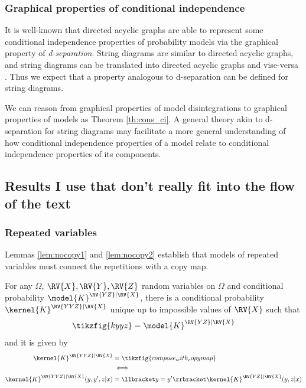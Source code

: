 \subsubsection{Graphical properties of conditional independence}

It is well-known that directed acyclic graphs are able to represent some conditional independence properties of probability models via the graphical property of \emph{d-separation}. String diagrams are similar to directed acyclic graphs, and string diagrams can be translated into directed acyclic graphs and vise-versa \citep{fong_causal_2013}. Thus we expect that a property analogous to d-separation can be defined for string diagrams.

We can reason from graphical properties of model disintegrations to graphical properties of models as Theorem \ref{th:cons_ci}. A general theory akin to d-separation for string diagrams may facilitate a more general understanding of how conditional independence properties of a model relate to conditional independence properties of its components.


\subsection{Results I use that don't really fit into the flow of the text}

\subsubsection{Repeated variables}

Lemmas \ref{lem:nocopy1} and \ref{lem:nocopy2} establish that models of repeated variables must connect the repetitions with a copy map.

\begin{lemma}\label{lem:nocopy1}
For any $\Omega$, $\RV{X},\RV{Y},\RV{Z}$ random variables on $\Omega$ and conditional probability $\model{K}^{\RV{YZ}|\RV{X}}$, there is a conditional probability $\kernel{K}^{\RV{YYZ}|\RV{X}}$ unique up to impossible values of $\RV{X}$ such that
\begin{align}
    \tikzfig{kyyz} = \model{K}^{\RV{YZ}|\RV{X}}
\end{align}
and it is given by
\begin{align}
        \kernel{K}^{\RV{YYZ}|\RV{X}} &= \tikzfig{compose_with_copymap}\\
        &\iff \\
        \kernel{K}^{\RV{YYZ}|\RV{X}}(y,y',z|x) &= \llbracket y=y' \rrbracket\kernel{K}^{\RV{YZ}|\RV{X}}(y,z|x)\\
\end{align}
\end{lemma}

